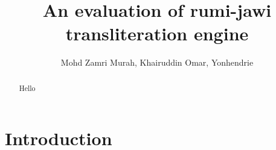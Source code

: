 \documentclass[a4paper]{article}
\title{An evaluation of rumi-jawi transliteration engine}
\author{Mohd Zamri Murah, Khairuddin Omar, Yonhendrie}
\begin{document}
\maketitle
\begin{abstract}
Hello
\end{abstract}

\section{Introduction}
\end{document}
